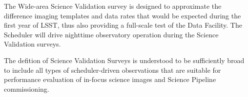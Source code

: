 
The Wide-area Science Validation survey is designed to approximate the difference imaging templates and data rates that would be expected during the first year of LSST, thus also providing a full-scale test of the Data Facility.
The Scheduler will drive nighttime observatory operation during the Science Validation surveys.

The defition of Science Validation Surveys is understood to be sufficiently broad to include all types of scheduler-driven observations that are suitable for performance evaluation of in-focus science images and Science Pipeline commissioning.





